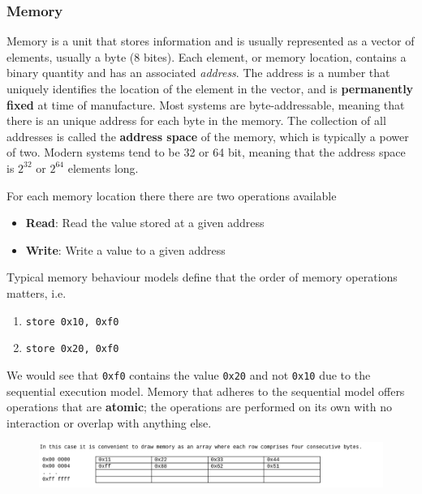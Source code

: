 \documentclass[../notes.tex]{subfiles}
\begin{document}

\subsubsection{Memory}
Memory is a unit that stores information and is usually represented as a vector of elements, usually a byte (8 bites).
Each element, or memory location, contains a binary quantity and has an associated \textit{address}.
The address is a number that uniquely identifies the location of the element in the vector, and is \textbf{permanently fixed} at time of manufacture.
Most systems are byte-addressable, meaning that there is an unique address for each byte in the memory.
The collection of all addresses is called the \textbf{address space} of the memory, which is typically a power of two.
Modern systems tend to be 32 or 64 bit, meaning that the address space is $ 2^{32} $ or $ 2^{64} $ elements long.

For each memory location there there are two operations available
\begin{itemize}
	\item \textbf{Read}: Read the value stored at a given address
	\item \textbf{Write}: Write a value to a given address
\end{itemize}


Typical memory behaviour models define that the order of memory operations matters, i.e. 

\begin{enumerate}
	\item \texttt{store 0x10, 0xf0} 
	\item \texttt{store 0x20, 0xf0} 
\end{enumerate}

We would see that \texttt{0xf0} contains the value \texttt{0x20} and not \texttt{0x10} due to the sequential execution model.
Memory that adheres to the sequential model offers operations that are \textbf{atomic}; the operations are performed on its own with no interaction or overlap with anything else.



\begin{figure}[H]
	\centering
	\includegraphics[width=\linewidth]{img/image_2022-09-16-02-10-27.png}
\end{figure}
\end{document}
